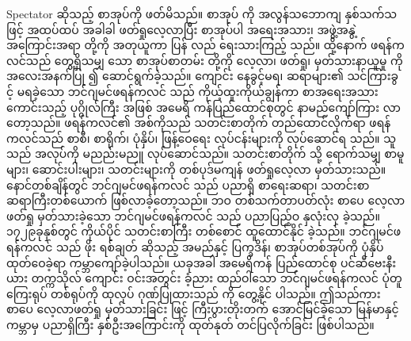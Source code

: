 \documentclass[conference]{IEEEtran}
\begin{document}
Spectator
{\padauktext ဆိုသည့် စာအုပ်ကို ဖတ်မိသည်။ စာအုပ် ကို အလွန်သဘောကျ နှစ်သက်သဖြင့် အထပ်ထပ် အခါခါ ဖတ်ရှုလေ့လာပြီး စာအုပ်ပါ အရေးအသား၊ အဖွဲ့အနွဲ့ အကြောင်းအရာ တို့ကို အတုယူကာ ပြန် လည် ရေးသားကြည့် သည်။ ထို့နောက် ဖရန်ကလင်သည် တွေ့ရှိသမျှ သော စာအုပ်စာတမ်း တို့ကို လေ့လာ၊ ဖတ်ရှု၊ မှတ်သားနာယူမှု ကို အလေးအနက်ပြု ၍ ဆောင်ရွက်ခဲ့သည်။ ကျောင်း နေခွင့်မရ၊ ဆရာများ၏ သင်ကြားခွင့် မရခဲ့သော ဘင်ဂျမင်ဖရန်ကလင် သည် ကိုယ့်ထူးကိုယ်ချွန်ကာ စာအရေးအသား ကောင်းသည့် ပုဂ္ဂိုလ်ကြီး အဖြစ် အမေရိ ကန်ပြည်ထောင်စုတွင် နာမည်ကျော်ကြား လာတော့သည်။ ဖရန်ကလင်၏ အစ်ကိုသည် သတင်းစာတိုက် တည်ထောင်လိုက်ရာ ဖရန် ကလင်သည် စာစီ၊ စာရိုက်၊ ပုံနှိပ်၊ ဖြန့်ဝေရေး လုပ်ငန်းများကို လုပ်ဆောင်ရ သည်။ သူသည် အလုပ်ကို မညည်းမညူ လုပ်ဆောင်သည်။ သတင်းစာတိုက် သို့ ရောက်သမျှ စာမူများ၊ ဆောင်းပါးများ၊ သတင်းများကို တစ်ပုဒ်မကျန် ဖတ်ရှုလေ့လာ မှတ်သားသည်။ နောင်တစ်ချိန်တွင် ဘင်ဂျမင်ဖရန်ကလင် သည် ပညာရှိ စာရေးဆရာ၊ သတင်းစာ ဆရာကြီးတစ်ယောက် ဖြစ်လာခဲ့တော့သည်။ ဘဝ တစ်သက်တာပတ်လုံး စာပေ လေ့လာဖတ်ရှု မှတ်သားခဲ့သော ဘင်ဂျမင်ဖရန်ကလင် သည် ပညာပြည့်ဝ နှလုံးလှ ခဲ့သည်။ ၁၇၂၉ခုနှစ်တွင် ကိုယ်ပိုင် သတင်းစာကြီး တစ်စောင် ထူထောင်နိုင် ခဲ့သည်။ ဘင်ဂျမင်ဖရန်ကလင် သည် ဖိုး ရစ်ချတ် ဆိုသည့် အမည်နှင့် ပြက္ခဒိန်၊ စာအုပ်တစ်အုပ်ကို ပုံနှိပ် ထုတ်ဝေခဲ့ရာ ကမ္ဘာကျော်ခဲ့ပါသည်။ ယခုအခါ အမေရိကန် ပြည်ထောင်စု ပင်ဆီဗေးနီးယား တက္ကသိုလ် ကျောင်း ဝင်းအတွင်း ခံ့ညား ထည်ဝါသော ဘင်ဂျမင်ဖရန်ကလင် ပုံတူကြေးရုပ် တစ်ရုပ်ကို ထုလုပ် ဂုဏ်ပြုထားသည် ကို တွေ့နိုင် ပါသည်။ ဤသည်ကား စာပေ လေ့လာဖတ်ရှု မှတ်သားခြင်း ဖြင့် ကြီးပွားတိုးတက် အောင်မြင်ခဲ့သော မြန်မာနှင့် ကမ္ဘာမှ ပညာရှိကြီး နှစ်ဦးအကြောင်းကို ထုတ်နုတ် တင်ပြလိုက်ခြင်း ဖြစ်ပါသည်။}\leavevmode\\
\end{document}
